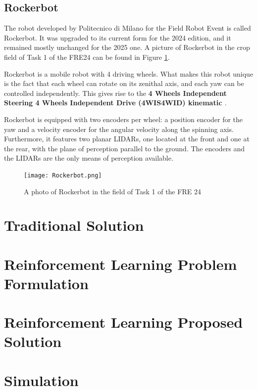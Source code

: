 \documentclass[11pt,a4paper,twocolumn]{article}
\begin{document}
\subsection{Rockerbot}
\label{sec:rockerbot}

The robot developed by Politecnico di Milano for the Field Robot Event is called Rockerbot. It was upgraded to its current form for the 2024 edition, and it remained mostly unchanged for the 2025 one. A picture of Rockerbot in the crop field of Task 1 of the FRE24 can be found in Figure \ref{fig:rockerbot}.

Rockerbot is a mobile robot with 4 driving wheels. What makes this robot unique is the fact that each wheel can rotate on its zenithal axis, and each yaw can be controlled independently. This gives rise to the \textbf{4 Wheels Independent Steering 4 Wheels Independent Drive (4WIS4WID) kinematic \cite{4WIS4WID}}.

Rockerbot is equipped with two encoders per wheel: a position encoder for the yaw and a velocity encoder for the angular velocity along the spinning axis. Furthermore, it features two planar LIDARs, one located at the front and one at the rear, with the plane of perception parallel to the ground. The encoders and the LIDARs are the only means of perception available.

\begin{figure}
    \centering
    \texttt{[image: Rockerbot.png]}
    \caption{A photo of Rockerbot in the field of Task 1 of the FRE 24}
    \label{fig:rockerbot}
\end{figure}

\section{Traditional Solution}


\section{Reinforcement Learning Problem Formulation}

\section{Reinforcement Learning Proposed Solution}

\section{Simulation}
\end{document}
